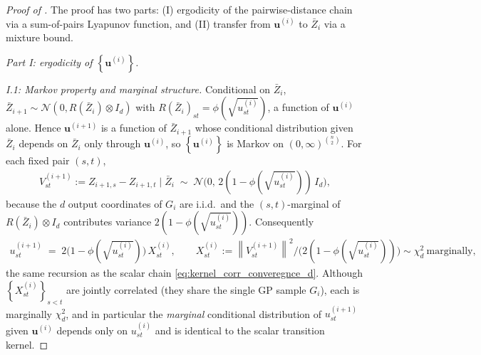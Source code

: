 \documentclass{article}
\newcommand{\Set}[1]{\left\{ #1 \right\}}
\newcommand{\norm}[1]{\left\|#1\right\|}
\newcommand{\cond}{\mid}
\newcommand{\mcN}{\mathcal{N}}
\newcommand{\bZ}{\bar{Z}}
\newcommand{\bu}{\mathbf{u}}
\begin{document}
\begin{proof}[Proof of ]
  The proof has two parts: (I) ergodicity of the pairwise-distance chain via a sum-of-pairs Lyapunov function, and (II) transfer from $\bu^{(i)}$ to $\bZ_i$ via a mixture bound.

  \emph{Part I: ergodicity of $\Set{\bu^{(i)}}$.}

  \emph{I.1: Markov property and marginal structure.} Conditional on $\bZ_i$, $\bZ_{i+1} \sim \mcN(0, R(\bZ_i) \otimes I_d)$ with $R(\bZ_i)_{st} = \phi(\sqrt{u_{st}^{(i)}})$, a function of $\bu^{(i)}$ alone. Hence $\bu^{(i+1)}$ is a function of $\bZ_{i+1}$ whose conditional distribution given $\bZ_i$ depends on $\bZ_i$ only through $\bu^{(i)}$, so $\Set{\bu^{(i)}}$ is Markov on $(0,\infty)^{\binom{n}{2}}$. For each fixed pair $(s,t)$,
  \begin{eqnarray*}
    V_{st}^{(i+1)} := Z_{i+1,s} - Z_{i+1,t} \cond \bZ_i \;\sim\; \mcN\!\bigl(0,\, 2(1 - \phi(\sqrt{u_{st}^{(i)}}))\, I_d\bigr),
  \end{eqnarray*}
  because the $d$ output coordinates of $G_i$ are i.i.d.\ and the $(s,t)$-marginal of $R(\bZ_i) \otimes I_d$ contributes variance $2(1 - \phi(\sqrt{u_{st}^{(i)}}))$. Consequently
  \begin{eqnarray*}
    u_{st}^{(i+1)} \;=\; 2\bigl(1 - \phi(\sqrt{u_{st}^{(i)}})\bigr)\, X_{st}^{(i)}, \qquad X_{st}^{(i)} := \norm{V_{st}^{(i+1)}}^2 / \bigl(2(1 - \phi(\sqrt{u_{st}^{(i)}}))\bigr) \sim \chi^2_d \ \text{marginally},
  \end{eqnarray*}
  the same recursion as the scalar chain \eqref{eq:kernel_corr_converegnce_d}. Although $\Set{X_{st}^{(i)}}_{s<t}$ are jointly correlated (they share the single GP sample $G_i$), each is marginally $\chi^2_d$, and in particular the \emph{marginal} conditional distribution of $u_{st}^{(i+1)}$ given $\bu^{(i)}$ depends only on $u_{st}^{(i)}$ and is identical to the scalar transition kernel.


\end{proof}
\end{document}
